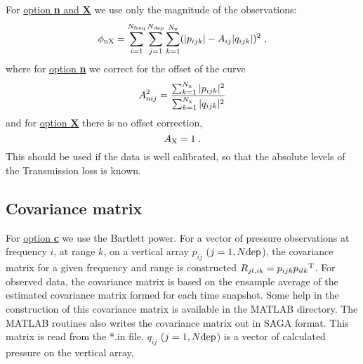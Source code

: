 \documentclass{saclantc}
\begin{document}
For  \underline{option {\bf n} and {\bf X}} we use only  the magnitude of the
observations:
\begin{equation}
\phi_{\rm nX}=  \sum^{N _{\rm freq}}_{i=1} 
          \sum^{N_{\rm dep}}_{j=1} \sum^{N_{\rm x}}_{k=1}
             (|p_{ijk}|- A_{ij}|q_{ijk}|)^2\;,
\label{eq:obj2}
\end{equation}
where for  \underline{option {\bf n}} we correct for the offset of the curve
\begin{equation}
A^2_{{\rm n}{ij}} = \frac{\sum^{N_{\rm x}}_{k=1} |p_{ijk}|^2}
       { \sum^{N _{\rm x}}_{k=1}|q_{ijk}|^2} 
\label{eq:objn}
\end{equation}
and for \underline{ option {\bf X}} there is no offset correction,
\begin{equation}
A_{\rm X}= 1 \; .
\label{eq:objX}
\end{equation}
This should be used if the data is well calibrated, so that the
absolute levels of the Transmission loss is known.

\subsection{Covariance matrix}

For  \underline{option {\bf c}} we use the Bartlett power. 
For a vector of pressure
observations at frequency $i$, at range $k$, on a vertical array $p_{ij}$ ($j=1, N{\rm dep}$),
the covariance matrix for a given frequency and range is constructed
${R_{jl,ik}}={ {p}_{ijk}}{ {p}_{ilk}}^{\rm T}$.  
%
For observed data, the covariance matrix is based on the ensample average
of the estimated  covariance matrix formed for each time snapshot.
Some help in the construction of this covariance matrix 
is available in the MATLAB
directory. The MATLAB routines also writes the covariance matrix out
in {\sf SAGA} format.
This matrix is read from the *.in file.
$q_{ij}$ ($j=1, N{\rm dep}$) is a vector of calculated pressure on
the vertical array,

\end{document}
